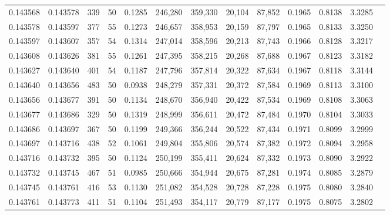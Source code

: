 \begin{tabular}{rrrrrrrrrrrrr}
0.143568 & 0.143578 &   339 &  50 &                                     0.1285 & 246,280 & 359,330 &  20,104 &  87,852 & 0.1965 & 0.8138 & 3.3285 \\
0.143578 & 0.143597 &   377 &  55 &                                     0.1273 & 246,657 & 358,953 &  20,159 &  87,797 & 0.1965 & 0.8133 & 3.3250 \\
0.143597 & 0.143607 &   357 &  54 &                                     0.1314 & 247,014 & 358,596 &  20,213 &  87,743 & 0.1966 & 0.8128 & 3.3217 \\
0.143608 & 0.143626 &   381 &  55 &                                     0.1261 & 247,395 & 358,215 &  20,268 &  87,688 & 0.1967 & 0.8123 & 3.3182 \\
0.143627 & 0.143640 &   401 &  54 &                                     0.1187 & 247,796 & 357,814 &  20,322 &  87,634 & 0.1967 & 0.8118 & 3.3144 \\
0.143640 & 0.143656 &   483 &  50 &                                     0.0938 & 248,279 & 357,331 &  20,372 &  87,584 & 0.1969 & 0.8113 & 3.3100 \\
0.143656 & 0.143677 &   391 &  50 &                                     0.1134 & 248,670 & 356,940 &  20,422 &  87,534 & 0.1969 & 0.8108 & 3.3063 \\
0.143677 & 0.143686 &   329 &  50 &                                     0.1319 & 248,999 & 356,611 &  20,472 &  87,484 & 0.1970 & 0.8104 & 3.3033 \\
0.143686 & 0.143697 &   367 &  50 &                                     0.1199 & 249,366 & 356,244 &  20,522 &  87,434 & 0.1971 & 0.8099 & 3.2999 \\
0.143697 & 0.143716 &   438 &  52 &                                     0.1061 & 249,804 & 355,806 &  20,574 &  87,382 & 0.1972 & 0.8094 & 3.2958 \\
0.143716 & 0.143732 &   395 &  50 &                                     0.1124 & 250,199 & 355,411 &  20,624 &  87,332 & 0.1973 & 0.8090 & 3.2922 \\
0.143732 & 0.143745 &   467 &  51 &                                     0.0985 & 250,666 & 354,944 &  20,675 &  87,281 & 0.1974 & 0.8085 & 3.2879 \\
0.143745 & 0.143761 &   416 &  53 &                                     0.1130 & 251,082 & 354,528 &  20,728 &  87,228 & 0.1975 & 0.8080 & 3.2840 \\
0.143761 & 0.143773 &   411 &  51 &                                     0.1104 & 251,493 & 354,117 &  20,779 &  87,177 & 0.1975 & 0.8075 & 3.2802 \\

\end{tabular}
